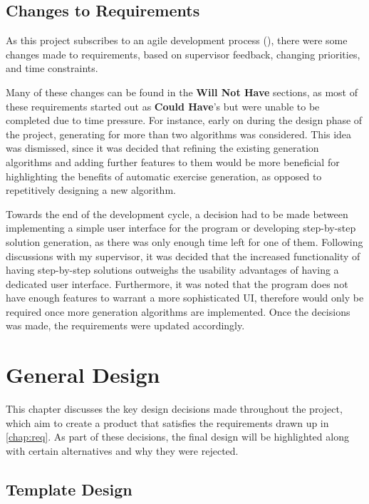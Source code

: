 \documentclass{l4proj}
\begin{document}
\section{Changes to Requirements}

As this project subscribes to an agile development process (\cite{}), there were some changes made to requirements, based on supervisor feedback, changing priorities, and time constraints.

Many of these changes can be found in the \textbf{Will Not Have} sections, as most of these requirements started out as \textbf{Could Have}'s but were unable to be completed due to time pressure. For instance, early on during the design phase of the project, generating for more than two algorithms was considered. This idea was dismissed, since it was decided that refining the existing generation algorithms and adding further features to them would be more beneficial for highlighting the benefits of automatic exercise generation, as opposed to repetitively designing a new algorithm. 

Towards the end of the development cycle, a decision had to be made between implementing a simple user interface for the program or developing step-by-step solution generation, as there was only enough time left for one of them. Following discussions with my supervisor, it was decided that the increased functionality of having step-by-step solutions outweighs the usability advantages of having a dedicated user interface. Furthermore, it was noted that the program does not have enough features to warrant a more sophisticated UI, therefore would only be required once more generation algorithms are implemented. Once the decisions was made, the requirements were updated accordingly.


\chapter{General Design}
\label{chap:des}

This chapter discusses the key design decisions made throughout the project, which aim to create a product that satisfies the requirements drawn up in \autoref{chap:req}. As part of these decisions, the final design will be highlighted along with certain alternatives and why they were rejected.

\section{Template Design}
\label{sec:td}
\end{document}
